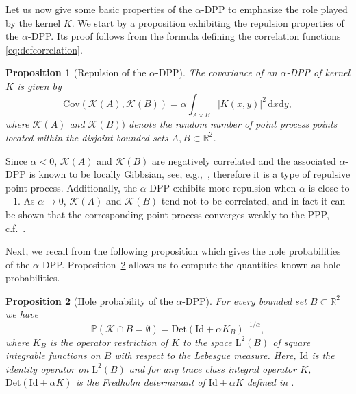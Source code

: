 \documentclass[12pt,draftclsnofoot,onecolumn]{IEEEtran}
\newtheorem{prop}{Proposition}
\begin{document}
Let us now give some basic properties of the $\alpha$-DPP to emphasize the role played by the kernel $K$. We start by a proposition exhibiting the repulsion properties of the $\alpha$-DPP. Its proof follows from the formula defining the correlation functions \eqref{eq:defcorrelation}.
\begin{prop}[Repulsion of the $\alpha$-DPP]
 The covariance of an 
 $\alpha$-DPP of kernel $K$ is given by 
\begin{equation*}
\mathrm{Cov}(\mathcal{K}(A),\mathcal{K}(B))=\alpha\int_{A\times B}|K(x,y)|^2\,\mathrm{d}x\mathrm{d}y, 
\end{equation*}
 where 
 $\mathcal{K}(A)$ and $\mathcal{K}(B))$ 
 denote the random number of point process 
 points located within the disjoint bounded sets 
 $A,B\subset\mathbb{R}^2$. 
\end{prop}

Since $\alpha < 0$, $\mathcal{K}(A)$ and $\mathcal{K}(B)$ are negatively correlated and the associated $\alpha$-DPP is known to be locally Gibbsian, see, e.g.,~\cite{GeorgiiYoo}, therefore it is a type of repulsive point process. Additionally, the $\alpha$-DPP exhibits more repulsion when $\alpha$ is close to $-1$. As $\alpha\rightarrow 0$, $\mathcal{K}(A)$ and $\mathcal{K}(B)$ tend not to be correlated, and in fact it can be shown that the corresponding point process converges weakly to the PPP, c.f.~\cite{ShiraiTakahashi}.

Next, we recall from \cite{Soshnikov} the following proposition which gives the hole probabilities of the $\alpha$-DPP.
Proposition~\ref{prop:holeproba} allows us to compute the quantities known as hole probabilities. 
\begin{prop}[Hole probability of the $\alpha$-DPP]
\label{prop:holeproba}
 For every bounded set $B\subset\mathbb{R}^2$ we have 
\begin{equation}
\label{aeq} 
 \mathbb P(\mathcal{K}\cap B = \emptyset ) = \mathrm{Det}(\mathrm{Id}+\alpha K_B)^{-1/\alpha},
\end{equation}
where $K_B$ is the operator restriction of $K$ to the space $\mathrm{L}^2(B)$ of square integrable functions on $B$ with respect to the Lebesgue measure. Here, $\mathrm{Id}$ is the identity operator on $\mathrm{L}^2(B)$ and for any trace class integral operator $K$, $\mathrm{Det}\left(\mathrm{Id}+\alpha K\right)$ is the Fredholm determinant of $\mathrm{Id}+\alpha K$ defined in \cite{Brezis}.


 
\end{prop}
\end{document}
